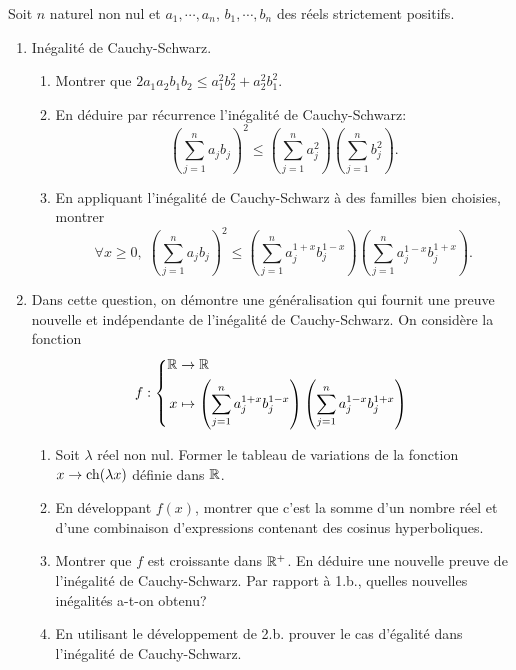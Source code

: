 Soit $n$ naturel non nul et $a_1, \cdots, a_n,\, b_1,\cdots ,b_n$ des réels strictement positifs.
\begin{enumerate}
 \item Inégalité de Cauchy-Schwarz.
 \begin{enumerate}
  \item Montrer que $2a_{1}a_{2}b_{1}b_{2} \leq a_{1}^{2}b_{2}^{2} + a_{2}^{2}b_{1}^{2}$.
  \item En déduire par récurrence l'inégalité de Cauchy-Schwarz:
  \[ \left( \sum_{j=1}^{n}a_{j}b_{j}\right)^2  \leq \left ( \sum_{j=1}^{n}a_{j}^{2}\right ) \left ( \sum_{j=1}^{n}b_{j}^{2}\right ).\]

  \item En appliquant l'inégalité de Cauchy-Schwarz à des familles bien choisies, montrer 
\[
 \forall x\geq 0, \;
 \left( \sum_{j=1}^na_jb_j \right)^2 \leq \left( \sum_{j=1}^n a_j^{1+x}b_j^{1-x}\right) \left( \sum_{j=1}^n a_j^{1-x}b_j^{1+x}\right) .
\]

 \end{enumerate}

  \item Dans cette question, on démontre une généralisation qui fournit une preuve nouvelle et indépendante de l'inégalité de Cauchy-Schwarz.\newline
On considère la fonction
\[
 f :
 \left\lbrace 
 \begin{aligned}
  \mathbb{R} &\rightarrow \mathbb{R} \\
  x &\mapsto
  \left(\sum_{j=1}^{n}a_j^{1 + x} b_j^{1 - x} \right) \left(\sum_{j=1}^{n}a_j^{1 - x} b_j^{1 + x} \right)
 \end{aligned}
\right. 
\]
\begin{enumerate}
 \item Soit $\lambda$ réel non nul. Former le tableau de variations de la fonction $x\rightarrow \operatorname{ch}(\lambda x)$ définie dans $\mathbb{R}$.
 
 \item En développant $f(x)$, montrer que c'est la somme d'un nombre réel et d'une combinaison d'expressions contenant des cosinus hyperboliques.
 
 \item Montrer que $f$ est croissante dans $\mathbb{R}^{+}$. En déduire une nouvelle preuve de l'inégalité de Cauchy-Schwarz.\newline
 Par rapport à 1.b., quelles nouvelles inégalités a-t-on obtenu?
 
 \item En utilisant le développement de 2.b. prouver le cas d'égalité dans l'inégalité de Cauchy-Schwarz.
\end{enumerate}

\end{enumerate}


